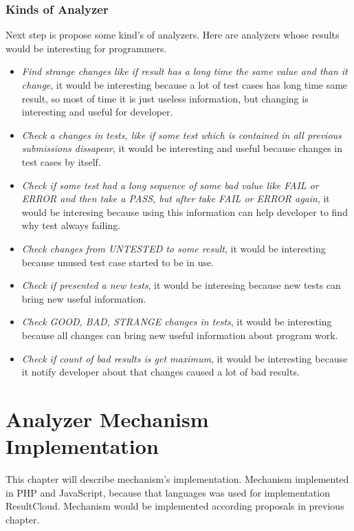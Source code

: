 \subsection{Kinds of Analyzer}

Next step is propose some kind's of analyzers. Here are analyzers whose results would be interesting for programmers.
\begin{itemize} 
\item \emph{Find strange changes like if result has a long time the same value and than it change}, it would be interesting because a lot of test cases has long time same result, so most of time it is just useless information, but changing is interesting and useful for developer.
\item \emph{Check a changes in tests, like if some test which is contained in all previous submissions dissapear}, it would be interesting and useful because changes in test cases by itself.
\item \emph{Check if some test had a long sequence of some bad value like FAIL or ERROR and then take a PASS, but after take FAIL or ERROR again}, it would be interesing because using this information can help developer to find why test always failing.
\item \emph{Check changes from UNTESTED to some result}, it would be interesting because unused test case started to be in use.
\item \emph{Check if presented a new tests}, it would be interesing because new tests can bring new useful information.
\item \emph{Check GOOD, BAD, STRANGE changes in tests}, it would be interesting because all changes can bring new useful information about program work. 
\item \emph{Check if count of bad results is get maximum}, it would be interesting because it notify developer about that changes caused a lot of bad results.
\end{itemize}

\chapter{Analyzer Mechanism Implementation}
\label{ch:analyzer_implement}

This chapter will describe mechanism's implementation. Mechanism implemented in PHP and JavaScript, because that languages was used for implementation ResultCloud. Mechanism would be implemented according proposals in previous chapter.

